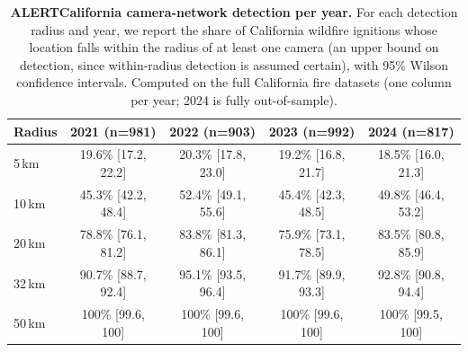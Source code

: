 \begin{table}[!t]
\caption{\textbf{ALERTCalifornia camera-network detection per year.} For each detection radius and year, we report the share of California wildfire ignitions whose location falls within the radius of at least one camera (an upper bound on detection, since within-radius detection is assumed certain), with 95\% Wilson confidence intervals. Computed on the full California fire datasets (one column per year; 2024 is fully out-of-sample).}
\label{tab:alertcalifornia}
{\small
\begin{tabular}{@{}lcccc@{}}
\toprule
\textbf{Radius} & \textbf{2021} (n=981) & \textbf{2022} (n=903) & \textbf{2023} (n=992) & \textbf{2024} (n=817) \\
\midrule
5\,km & 19.6\% [17.2, 22.2] & 20.3\% [17.8, 23.0] & 19.2\% [16.8, 21.7] & 18.5\% [16.0, 21.3] \\
10\,km & 45.3\% [42.2, 48.4] & 52.4\% [49.1, 55.6] & 45.4\% [42.3, 48.5] & 49.8\% [46.4, 53.2] \\
20\,km & 78.8\% [76.1, 81.2] & 83.8\% [81.3, 86.1] & 75.9\% [73.1, 78.5] & 83.5\% [80.8, 85.9] \\
32\,km & 90.7\% [88.7, 92.4] & 95.1\% [93.5, 96.4] & 91.7\% [89.9, 93.3] & 92.8\% [90.8, 94.4] \\
50\,km & 100\% [99.6, 100] & 100\% [99.6, 100] & 100\% [99.6, 100] & 100\% [99.5, 100] \\
\bottomrule
\end{tabular}
}
\end{table}
